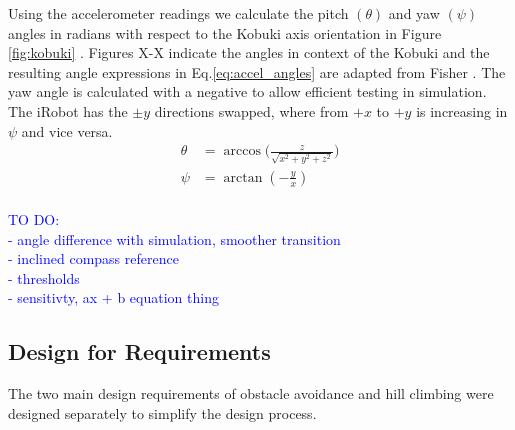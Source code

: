 \documentclass[11pt]{article}
\begin{document}
Using the accelerometer readings we calculate the pitch $(\theta)$ and yaw $(\psi)$ angles in radians with respect to the Kobuki axis orientation in Figure \ref{fig:kobuki} \cite{fisher_2011}. %
Figures X-X indicate the angles in context of the Kobuki and the resulting angle expressions in Eq.\ref{eq:accel_angles} are adapted from Fisher \cite{fisher_2011}. The yaw angle is calculated with a negative to allow efficient testing in simulation. The iRobot has the $\pm y$ directions swapped, where from $+x$ to $+y$ is increasing in $\psi$ and vice versa.
\begin{align}\label{eq:accel_angles}
    \theta &= \arccos \biggr( \frac{z}{\sqrt{x^2 + y^2 + z^2}} \biggr)\\
    \psi &= \arctan(-\frac{y}{x})\\
\end{align}

\textcolor{blue}{TO DO:\\
- angle difference with simulation, smoother transition\\
- inclined compass reference\\
- thresholds\\
- sensitivty, ax + b equation thing}

\subsection{Design for Requirements}
The two main design requirements of obstacle avoidance and hill climbing were designed separately to simplify the design process.  
\end{document}
